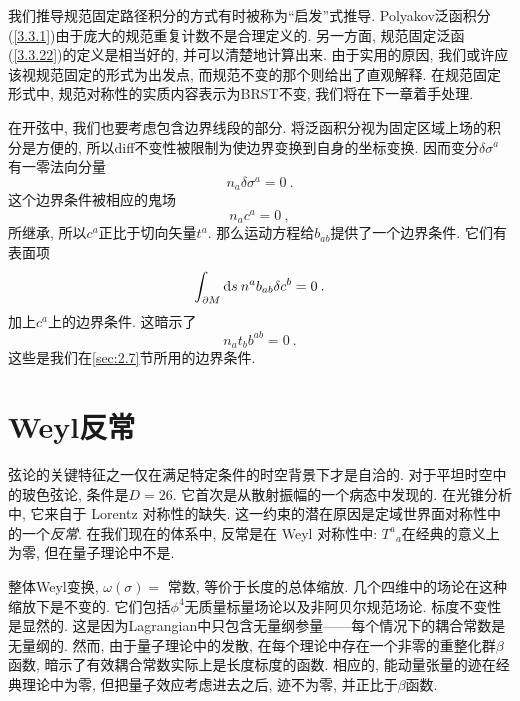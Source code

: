 我们推导规范固定路径积分的方式有时被称为“启发”式推导. Polyakov泛函积分(\ref{3.3.1})由于庞大的规范重复计数不是合理定义的. 另一方面, 规范固定泛函(\ref{3.3.22})的定义是相当好的, 并可以清楚地计算出来. 由于实用的原因, 我们或许应该视规范固定的形式为出发点, 而规范不变的那个则给出了直观解释. 在规范固定形式中, 规范对称性的实质内容表示为BRST不变, 我们将在下一章着手处理. 

在开弦中, 我们也要考虑包含边界线段的部分. 将泛函积分视为固定区域上场的积分是方便的, 所以diff不变性被限制为使边界变换到自身的坐标变换. 因而变分$\delta \sigma^{a}$ 有一零法向分量
\begin{equation}
n_{a} \delta \sigma^{a}=0 \:. \label{3.3.25}
\end{equation}
这个边界条件被相应的鬼场
\begin{equation}
n_{a} c^{a}=0 \:, \label{3.3.26}
\end{equation}
所继承, 所以$c^{a}$正比于切向矢量$t^{a}$. 那么运动方程给$b_{a b}$提供了一个边界条件. 它们有表面项
\begin{equation}
\int_{\partial M} \mathrm{d} s\: n^{a} b_{a b} \delta c^{b}=0 \:. \label{3.3.27}
\end{equation}
加上$c^a$上的边界条件. 这暗示了
\begin{equation}
n_{a} t_{b} b^{a b}=0 \:. \label{3.3.28}
\end{equation}
这些是我们在\ref{sec:2.7}节所用的边界条件.

\section{\texorpdfstring{Weyl反常}{3.4 The Weyl anomaly}} \label{sec:3.4}

弦论的关键特征之一仅在满足特定条件的时空背景下才是自洽的. 对于平坦时空中的玻色弦论, 条件是$D=26$. 
它首次是从散射振幅的一个病态中发现的. 在光锥分析中, 
它来自于 Lorentz 对称性的缺失. 这一约束的潜在原因是定域世界面对称性中的一个\emph{反常}. 在我们现在的体系中, 反常是在 Weyl 对称性中: $T^{a}{}_{a}$在经典的意义上为零, 
但在量子理论中不是. 

整体Weyl变换, $\omega(\sigma)=$ 常数, 等价于长度的总体缩放. 几个四维中的场论在这种缩放下是不变的. 它们包括$\phi^4$无质量标量场论以及非阿贝尔规范场论. 标度不变性是显然的. 这是因为Lagrangian中只包含无量纲参量——每个情况下的耦合常数是无量纲的. 然而, 由于量子理论中的发散, 在每个理论中存在一个非零的重整化群$\beta$函数, 暗示了有效耦合常数实际上是长度标度的函数. 相应的, 能动量张量的迹在经典理论中为零, 但把量子效应考虑进去之后, 迹不为零, 并正比于$\beta$函数. 

